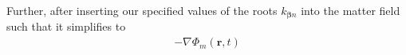 \documentclass{article}
\begin{document}
Further, after inserting our specified values of the roots $k_{\bm{\beta}n}$ into the matter field such that it simplifies to
\begin{equation}
\begin{split}
-\nabla\Phi_m(\mathbf{r},t) 

\end{split}
\end{equation}
\end{document}
